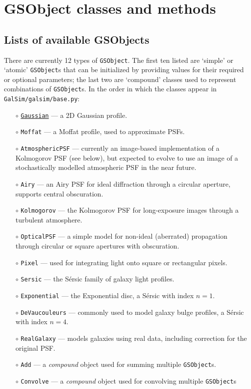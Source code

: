 \documentclass[preprint,10pt]{aastex}
\newcommand{\gsobject}{{\tt GSObject}}
\begin{document}
\newpage 

\section{GSObject classes and methods}\label{sect:gsobjects}
\subsection{Lists of available GSObjects}

There are currently 12 types of \gsobject. The first ten listed are
`simple' or `atomic' \gsobject s that can be initialized by providing
values for their required or optional parameters; the last two are
`compound' classes used to represent combinations of \gsobject s.  
In the order in which the classes appear in {\tt GalSim/galsim/base.py}:
\begin{itemize}
\item[$\circ$] \href{http://galsim-developers.github.com/GalSim/classgalsim_1_1base_1_1_gaussian.html}{\texttt{Gaussian}} --- a 2D Gaussian profile.
\item[$\circ$] \texttt{Moffat} --- a Moffat profile, used to approximate PSFs.
\item[$\circ$] \texttt{AtmosphericPSF} --- currently an image-based
  implementation of a Kolmogorov PSF (see below), but expected to evolve to
  use an image of a stochastically modelled atmospheric PSF in the near future.
\item[$\circ$] \texttt{Airy} --- an Airy PSF for ideal diffraction
  through a circular aperture, supports central obscuration.
\item[$\circ$] \texttt{Kolmogorov} --- the Kolmogorov PSF for long-exposure
  images through a turbulent atmosphere.
\item[$\circ$] \texttt{OpticalPSF} --- a simple model for non-ideal
  (aberrated) propagation through circular or square apertures with obscuration.
\item[$\circ$] \texttt{Pixel} --- used for integrating light onto square or
  rectangular pixels.
\item[$\circ$] \texttt{Sersic} --- the S\'{e}rsic family of galaxy light
  profiles.
\item[$\circ$] \texttt{Exponential} --- the Exponential disc, a S\'{e}rsic
  with index $n=1$.
\item[$\circ$] \texttt{DeVaucouleurs} --- commonly used to model galaxy bulge
  profiles, a S\'{e}rsic with index $n=4$.
\item[$\circ$] \texttt{RealGalaxy} --- models galaxies using real
  data, including correction for the original PSF.
\item[$\circ$] \texttt{Add} --- a \emph{compound} object used for
  summing multiple \gsobject s.
\item[$\circ$] \texttt{Convolve} --- a \emph{compound} object used for
convolving multiple \gsobject s
\end{itemize}
\end{document}

